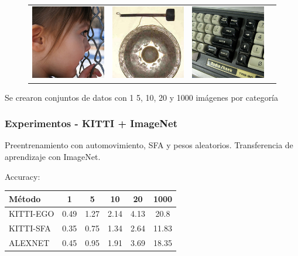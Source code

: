 \documentclass{beamer}
\begin{document}
\begin{frame}
\begin{figure}
{\begin{tabular}{cccc}
\includegraphics[width = 1.5in]{./images/imagenet/n03000134_789.JPEG} &
\includegraphics[width = 1.5in]{./images/imagenet/n03017168_743.JPEG} &
\includegraphics[width = 1.5in]{./images/imagenet/n03085013_2149.JPEG} \\
\end{tabular}
}
\end{figure}
\vfill
Se crearon conjuntos de datos con 1 5, 10, 20 y 1000 imágenes por categoría
\vfill
\end{frame}





\begin{frame}
\frametitle{Experimentos - KITTI + ImageNet}

Preentrenamiento con automovimiento, SFA y pesos aleatorios.\pause
\vfill
Transferencia de aprendizaje con ImageNet.\pause
\vfill

Accuracy:
\begin{table}
\centering
\begin{tabular}{l|ccccc}
\hline
\multicolumn{1}{l}{Método}
& \multicolumn{1}{c}{1}
& \multicolumn{1}{c}{5}
& \multicolumn{1}{c}{10}
& \multicolumn{1}{c}{20}
& \multicolumn{1}{c}{1000} \\ \cline{1-6}
\hline

KITTI-EGO & 0.49 & 1.27 & 2.14 & 4.13 & 20.8\\
KITTI-SFA & 0.35 & 0.75 & 1.34 & 2.64 & 11.83\\
ALEXNET & 0.45 & 0.95 & 1.91 & 3.69 & 18.35\\

\hline
\end{tabular}
\end{table}
\end{frame}
\end{document}

